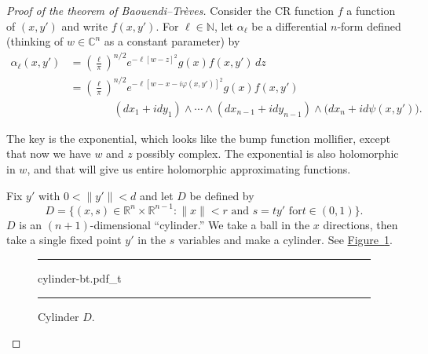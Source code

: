 \documentclass[12pt,openany]{book}
\newcommand{\snorm}[1]{\lVert {#1} \rVert}
\newcommand{\C}{{\mathbb{C}}}
\newcommand{\R}{{\mathbb{R}}}
\newcommand{\N}{{\mathbb{N}}}
\theoremstyle{plain}
\theoremstyle{remark}
\theoremstyle{definition}
\newenvironment{myfig}{%
\begin{figure}[h!t]
\noindent\rule{\textwidth}{0.5pt}\vspace{12pt}\par\centering}%
{\par\noindent\rule{\textwidth}{0.5pt}
\end{figure}}
\theoremstyle{exercise}
\theoremstyle{example}
\newcommand{\figureref}[1]{\hyperref[#1]{Figure~\ref*{#1}}}
\begin{document}
\begin{proof}[Proof of the theorem of Baouendi--Tr{\`e}ves]
Consider the CR function $f$ a function of $(x,y')$
and write $f(x,y')$.
For $\ell \in \N$,
let $\alpha_{\ell}$ be a differential $n$-form defined (thinking
of $w \in \C^n$ as a constant parameter) by
\begin{equation*}
\begin{split}
\alpha_{\ell}(x,y')
& =
{\left(\frac{\ell}{\pi}\right)}^{n/2}
e^{-\ell [w - z]^2} g(x) f(x,y')
\,
dz
\\
& =
{\left(\frac{\ell}{\pi}\right)}^{n/2}
e^{-\ell [w - x-i\varphi(x,y')]^2} g(x) f(x,y')
\\
& \qquad \qquad
(dx_1 + idy_1)  \wedge
\cdots \wedge
(dx_{n-1} + i dy_{n-1})
\wedge
\bigl(dx_{n} + i d \psi (x,y') \bigr) .
\end{split}
\end{equation*}

The key is the exponential, which looks like the bump function
mollifier, except that now we have $w$ and $z$
possibly complex.  The exponential is also holomorphic in $w$, and that will
give us entire holomorphic approximating functions.

Fix $y'$ with $0 < \snorm{y'} < d$ and let $D$ be defined by
\begin{equation*}
D = \bigl\{ (x,s) \in \R^n \times \R^{n-1} : \snorm{x} < r \text{ and } s = t y' \text{ for
$t \in (0,1)$} \bigr\} .
\end{equation*}
$D$ is an $(n+1)$-dimensional ``cylinder.''  We take a ball in the
$x$ directions, then take a single fixed point $y'$ in the $s$ variables and make a
cylinder.  See \figureref{fig:cylinder-bt}.

\begin{myfig}
{cylinder-bt.pdf_t}
\caption{Cylinder $D$.\label{fig:cylinder-bt}}
\end{myfig}


\end{proof}
\end{document}
